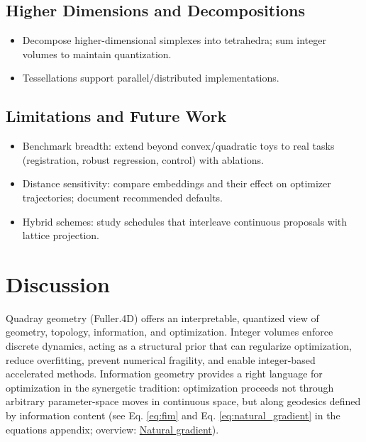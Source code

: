 \documentclass[
  10pt,
]{article}
\providecommand{\tightlist}{%
  \setlength{\itemsep}{0pt}\setlength{\parskip}{0pt}}
\begin{document}
\hypertarget{higher-dimensions-and-decompositions}{%
\subsection{Higher Dimensions and
Decompositions}\label{higher-dimensions-and-decompositions}}

\begin{itemize}
\tightlist
\item
  Decompose higher-dimensional simplexes into tetrahedra; sum integer
  volumes to maintain quantization.
\item
  Tessellations support parallel/distributed implementations.
\end{itemize}

\hypertarget{limitations-and-future-work}{%
\subsection{Limitations and Future
Work}\label{limitations-and-future-work}}

\begin{itemize}
\tightlist
\item
  Benchmark breadth: extend beyond convex/quadratic toys to real tasks
  (registration, robust regression, control) with ablations.
\item
  Distance sensitivity: compare embeddings and their effect on optimizer
  trajectories; document recommended defaults.
\item
  Hybrid schemes: study schedules that interleave continuous proposals
  with lattice projection.
\end{itemize}

\newpage

\hypertarget{discussion}{%
\section{Discussion}\label{discussion}}

Quadray geometry (Fuller.4D) offers an interpretable, quantized view of
geometry, topology, information, and optimization. Integer volumes
enforce discrete dynamics, acting as a structural prior that can
regularize optimization, reduce overfitting, prevent numerical
fragility, and enable integer-based accelerated methods. Information
geometry provides a right language for optimization in the synergetic
tradition: optimization proceeds not through arbitrary parameter-space
moves in continuous space, but along geodesics defined by information
content (see Eq. \eqref{eq:fim} and Eq. \eqref{eq:natural_gradient} in
the equations appendix; overview:
\href{https://en.wikipedia.org/wiki/Natural_gradient}{Natural
gradient}).
\end{document}
